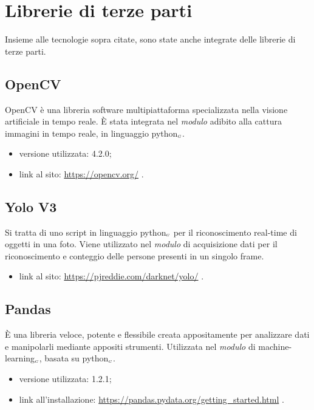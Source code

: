 \section{Librerie di terze parti}\label{LibrerieDiTerzeParti}
Insieme alle tecnologie sopra citate, sono state anche integrate delle librerie di terze parti.

\subsection{OpenCV}\label{LibrerieOpenCV}
OpenCV è una libreria software multipiattaforma specializzata nella visione artificiale in tempo reale.
È stata integrata nel \textit{modulo} adibito alla cattura immagini in tempo reale, in linguaggio python$_{\scaleto{G}{3pt}}$.

\begin{itemize}
  \item versione utilizzata: 4.2.0;
  \item link al sito: \url{https://opencv.org/} .
\end{itemize}

\subsection{Yolo V3}\label{LibrerieYoloV3}
Si tratta di uno script in linguaggio python$_{\scaleto{G}{3pt}}$ per il riconoscimento real-time di oggetti in una foto.
Viene utilizzato nel \textit{modulo} di acquisizione dati per il riconoscimento e conteggio delle persone presenti in un singolo frame.

\begin{itemize}
  \item link al sito: \url{https://pjreddie.com/darknet/yolo/} .
\end{itemize}

\subsection{Pandas}\label{LibreriePandas}
È una libreria veloce, potente e flessibile creata appositamente per analizzare dati e manipolarli mediante appositi strumenti.
Utilizzata nel \textit{modulo} di machine-learning$_{\scaleto{G}{3pt}}$, basata su python$_{\scaleto{G}{3pt}}$.

\begin{itemize}
  \item versione utilizzata: 1.2.1;
  \item link all'installazione: \url{https://pandas.pydata.org/getting_started.html} .
\end{itemize}


